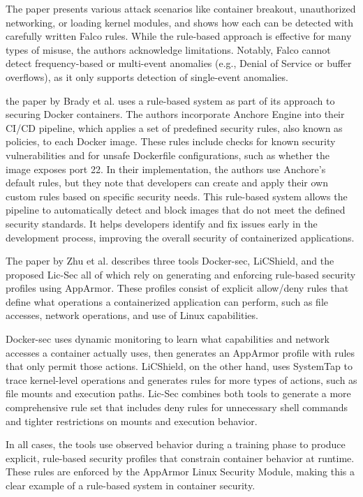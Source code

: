 \documentclass[12pt]{report}
\begin{document}
\begin{doublespace}
The paper presents various attack scenarios like container breakout, unauthorized networking, or loading kernel modules, and shows how each can be detected with carefully written Falco rules. While the rule-based approach is effective for many types of misuse, the authors acknowledge limitations. Notably, Falco cannot detect frequency-based or multi-event anomalies (e.g., Denial of Service or buffer overflows), as it only supports detection of single-event anomalies.

the paper by Brady et al. \cite{brady2020docker} uses a rule-based system as part of its approach to securing Docker containers. The authors incorporate Anchore Engine into their CI/CD pipeline, which applies a set of predefined security rules, also known as policies, to each Docker image. These rules include checks for known security vulnerabilities and for unsafe Dockerfile configurations, such as whether the image exposes port 22. In their implementation, the authors use Anchore's default rules, but they note that developers can create and apply their own custom rules based on specific security needs. This rule-based system allows the pipeline to automatically detect and block images that do not meet the defined security standards. It helps developers identify and fix issues early in the development process, improving the overall security of containerized applications.

The paper by Zhu et al. \cite{zhu2021lic} describes three tools Docker-sec, LiCShield, and the proposed Lic-Sec all of which rely on generating and enforcing rule-based security profiles using AppArmor. These profiles consist of explicit allow/deny rules that define what operations a containerized application can perform, such as file accesses, network operations, and use of Linux capabilities.

Docker-sec uses dynamic monitoring to learn what capabilities and network accesses a container actually uses, then generates an AppArmor profile with rules that only permit those actions. LiCShield, on the other hand, uses SystemTap to trace kernel-level operations and generates rules for more types of actions, such as file mounts and execution paths. Lic-Sec combines both tools to generate a more comprehensive rule set that includes deny rules for unnecessary shell commands and tighter restrictions on mounts and execution behavior.

In all cases, the tools use observed behavior during a training phase to produce explicit, rule-based security profiles that constrain container behavior at runtime. These rules are enforced by the AppArmor Linux Security Module, making this a clear example of a rule-based system in container security.


\end{doublespace}
\end{document}

